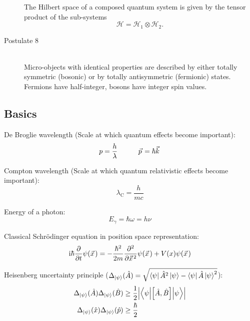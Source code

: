\begin{description}
				The Hilbert space of a composed quantum system is given by the tensor product of the sub-systems
				\begin{equation}
					\mathcal{H} = \mathcal{H}_1 \otimes \mathcal{H}_2.
				\end{equation}
			\item[Postulate 8]\hfill \\
				Micro-objects with identical properties are described by either totally symmetric (bosonic) or by totally antisymmetric (fermionic) states. Fermions have half-integer, bosons have integer spin values.
		\end{description}

	\subsection{Basics}
		\noindent
		De Broglie wavelength (Scale at which quantum effects become important):
		\begin{equation}
				p = \frac{h}{\lambda} 
				\hsp
				\vec{p} = \hbar \vec{k}
		\end{equation}

		\noindent
		Compton wavelength (Scale at which quantum relativistic effects become important):
		\begin{equation}
			\lambda_\mathrm{C} = \frac{h}{mc}
		\end{equation}

		\noindent
		Energy of a photon:
		\begin{equation}
			E_\gamma = \hbar\omega = h\nu
		\end{equation}

		\noindent
		Classical Schrödinger equation in position space representation:
		\begin{equation}
			\i\hbar\pdv{t}\psi(\vec{x}) = -\frac{\hbar^2}{2m}\frac{\partial^2}{\partial \vec{x}^2}\psi(\vec{x}) + V(x)\psi(\vec{x})
		\end{equation}

		\noindent
		Heisenberg uncertainty principle ($\Delta_{\Ket{\psi}} (\hat{A}) = \sqrt{\Bra{\psi}\hat{A}^2\Ket{\psi} - \Bra{\psi}\hat{A}\Ket{\psi}^2}$):
		\begin{equation}
			\begin{aligned}
				\Delta_{\Ket{\psi}}(\hat{A}) \Delta_{\Ket{\psi}}(\hat{B}) &\ge
				\frac{1}{2} \abs{\mel**{\psi}{\comm{\hat{A}}{\hat{B}}}{\psi}} \\
				\Delta_{\Ket{\psi}}(\hat{x}) \Delta_{\Ket{\psi}}(\hat{p}) &\ge
				\frac{\hbar}{2}
			\end{aligned}
		\end{equation}

